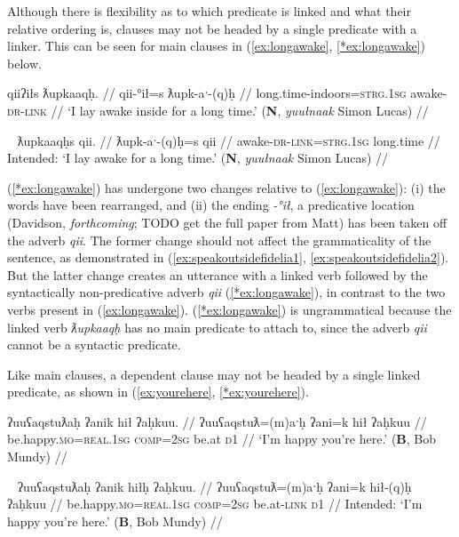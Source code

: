 Although there is flexibility as to which predicate is linked and what their relative ordering is, clauses may not be headed by a single predicate with a linker. This can be seen for main clauses in (\ref{ex:longawake}, \ref{*ex:longawake}) below.

\ex \label{ex:longawake}
\begingl
\glpreamble qiiʔiłs ƛupkaaqḥ. //
\gla qii-°ił=s ƛupk-aˑ-(q)ḥ //
\glb long.time-indoors=\textsc{strg.1sg} awake-\textsc{dr}-\textsc{link} //
\glft `I lay awake inside for a long time.' (\textbf{N}, \textit{yuułnaak} Simon Lucas) //
\endgl
\xe

\ex~ \label{*ex:longawake}
\begingl
\glpreamble *ƛupkaaqḥs qii. //
\gla ƛupk-aˑ-(q)ḥ=s qii //
\glb awake-\textsc{dr}-\textsc{link}=\textsc{strg.1sg} long.time //
\glft Intended: `I lay awake for a long time.' (\textbf{N}, \textit{yuułnaak} Simon Lucas) //
\endgl
\xe

(\ref{*ex:longawake}) has undergone two changes relative to (\ref{ex:longawake}): (i) the words have been rearranged, and (ii) the ending \textit{-°ił}, a predicative location (Davidson, \textit{forthcoming}; TODO get the full paper from Matt) has been taken off the adverb \textit{qii}. The former change should not affect the grammaticality of the sentence, as demonstrated in (\ref{ex:speakoutsidefidelia1}, \ref{ex:speakoutsidefidelia2}). But the latter change creates an utterance with a linked verb followed by the syntactically non-predicative adverb \textit{qii} (\ref{*ex:longawake}), in contrast to the two verbs present in (\ref{ex:longawake}). (\ref{*ex:longawake}) is ungrammatical because the linked verb \textit{ƛupkaaqḥ} has no main predicate to attach to, since the adverb \textit{qii} cannot be a syntactic predicate.

Like main clauses, a dependent clause may not be headed by a single linked predicate, as shown in (\ref{ex:yourehere}, \ref{*ex:yourehere}).

\ex \label{ex:yourehere}
\begingl
\glpreamble ʔuuʕaqstuƛaḥ ʔanik hił ʔaḥkuu. //
\gla ʔuuʕaqstuƛ=(m)aˑḥ ʔani=k hił ʔaḥkuu //
\glb be.happy.\textsc{mo}=\textsc{real.1sg} \textsc{comp}=\textsc{2sg} be.at \textsc{d1} //
\glft `I'm happy you're here.' (\textbf{B}, Bob Mundy) //
\endgl
\xe

\ex~ \label{*ex:yourehere}
\begingl
\glpreamble *ʔuuʕaqstuƛaḥ ʔanik hiłḥ ʔaḥkuu. //
\gla ʔuuʕaqstuƛ=(m)aˑḥ ʔani=k hił-(q)ḥ ʔaḥkuu //
\glb be.happy.\textsc{mo}=\textsc{real.1sg} \textsc{comp}=\textsc{2sg} be.at-\textsc{link} \textsc{d1} //
\glft Intended: `I'm happy you're here.' (\textbf{B}, Bob Mundy) //
\endgl
\xe

